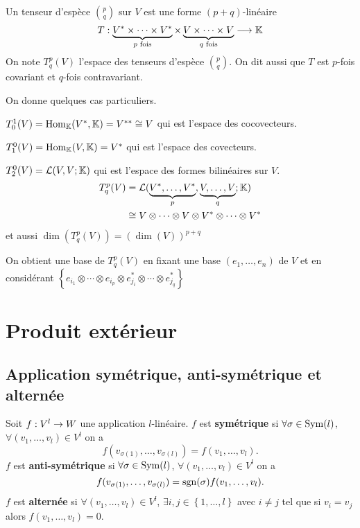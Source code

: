 \begin{definition}
  Un tenseur d'espèce $p \choose q$ sur $V$ est une forme $(p+q)$-linéaire
  $$T: \underbrace{V^*\times\cdots\times V^*}_\text{$p$ fois} \times \underbrace{V\times\cdots\times V}_\text{$q$ fois} \longrightarrow \mathbb{K}$$
  On note  $T^p_q(V)$ l'espace des tenseurs d'espèce  $p \choose q$. On dit aussi que $T$ est $p$-fois covariant et $q$-fois contravariant.
\end{definition}
On donne quelques cas particuliers.
\par $T_0^1(V) = \mathrm{Hom}_{\mathbb{K}}(V^*, \mathbb{K}) = V^{**} \cong V$ qui est l'espace des cocovecteurs.
\par  $T_1^0(V) = \mathrm{Hom}_{\mathbb{K}}(V, \mathbb{K}) = V^*$ qui est l'espace des covecteurs.
\par $T_2^0(V) = \mathcal{L}(V, V; \mathbb{K})$ qui est l'espace des formes bilinéaires sur  $V$.
\begin{align*}
  T^p_q(V) &= \mathcal{L}(\underbrace{V^*, \dots, V^*}_p, \underbrace{V, \dots, V}_q; \mathbb{K}) \\
           &\cong V\otimes \cdots\otimes V \otimes V^*\otimes \cdots \otimes V^*
\end{align*}
et aussi $\dim(T_q^p(V)) = (\dim(V))^{p+q}$
\par On obtient une base de  $T_q^p(V)$ en fixant une base  $(e_1, \dots, e_n)$ de $V$ et en considérant $\left\{ e_{i_1}\otimes \cdots \otimes e_{i_p}\otimes e_{j_i}^*\otimes \cdots \otimes e_{j_q}^* \right\}$

\chapter{Produit extérieur}
\section{Application symétrique, anti-symétrique et alternée}

\begin{definition}
  Soit $f: V^l \rightarrow W$ une application $l$-linéaire. $f$ est \textbf{symétrique} si $\forall \sigma \in \operatorname{Sym}(l)$, $\forall (v_1,\dots, v_l) \in V^l$ on a $$f(v_{\sigma(1)}, \dots, v_{\sigma(l)}) = f(v_1, \dots, v_l).$$
  $f$ est \textbf{anti-symétrique} si $\forall \sigma \in \operatorname{Sym}(l)$, $\forall (v_1, \dots, v_l) \in V^l$ on a $$f(v_{\sigma(1)}, \dots, v_{\sigma(l)}) = \operatorname{sgn}(\sigma)f(v_1, \dots, v_l).$$
  $f$ est \textbf{alternée} si $\forall (v_1, \dots, v_l) \in V^l$, $\exists i, j \in \left\{ 1, \dots, l \right\}$ avec $i \not = j$ tel que si $v_i = v_j$ alors $f(v_1, \dots, v_l) = 0$.
\end{definition}

